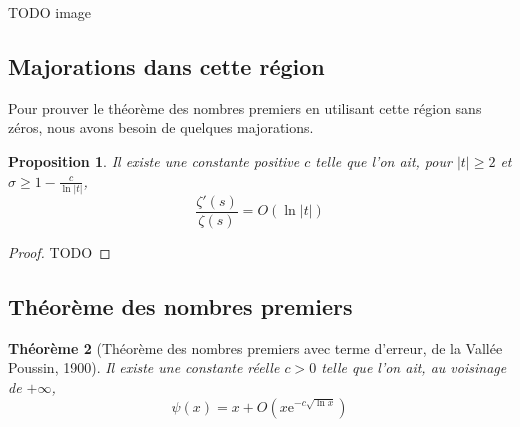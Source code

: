 \documentclass[french]{report}
\newtheorem{theorem}{Théorème}[section]
\newtheorem{proposition}[theorem]{Proposition}
\begin{document}
TODO image %

\subsection{Majorations dans cette région}

Pour prouver le théorème des nombres premiers en utilisant cette région sans zéros, nous avons besoin de quelques majorations.

\begin{proposition}\label{prop:majoration-zeta-zeta-prime-region-classique}
  Il existe une constante positive $c$ telle que l'on ait, pour $|t|\geq2$ et $\sigma\geq1-\frac{c}{\ln|t|}$,
  \[ \frac{\zeta'(s)}{\zeta(s)} = O(\ln|t|) \]
\end{proposition}

\begin{proof}
  TODO
\end{proof}

\subsection{Théorème des nombres premiers}

\begin{theorem}[Théorème des nombres premiers avec terme d'erreur, de la Vallée Poussin, 1900]\label{eq:tnp-vallee-poussin}
  Il existe une constante réelle $c>0$ telle que l'on ait, au voisinage de $+\infty$,
  \begin{equation}
    \psi(x)=x+O(x\mathrm{e}^{-c\sqrt{\ln x}})
  \end{equation}
\end{theorem}
\end{document}
